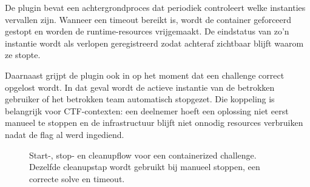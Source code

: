De plugin bevat een achtergrondproces dat periodiek controleert welke instanties vervallen zijn. Wanneer een timeout bereikt is, wordt de container geforceerd gestopt en worden de runtime-resources vrijgemaakt. De eindstatus van zo'n instantie wordt als verlopen geregistreerd zodat achteraf zichtbaar blijft waarom ze stopte.

Daarnaast grijpt de plugin ook in op het moment dat een challenge correct opgelost wordt. In dat geval wordt de actieve instantie van de betrokken gebruiker of het betrokken team automatisch stopgezet. Die koppeling is belangrijk voor CTF-contexten: een deelnemer hoeft een oplossing niet eerst manueel te stoppen en de infrastructuur blijft niet onnodig resources verbruiken nadat de flag al werd ingediend.

\begin{figure}[H]
  \centering
  \caption[Start-, stop- en cleanupflow]{Start-, stop- en cleanupflow voor een containerized challenge. Dezelfde cleanupstap wordt gebruikt bij manueel stoppen, een correcte solve en timeout.}
  \label{fig:runtime-flow}
\end{figure}


